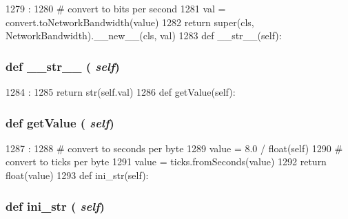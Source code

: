\begin{DoxyCode}
1279                            :
1280         # convert to bits per second
1281         val = convert.toNetworkBandwidth(value)
1282         return super(cls, NetworkBandwidth).__new__(cls, val)
1283 
    def __str__(self):
\end{DoxyCode}
\hypertarget{classm5_1_1params_1_1NetworkBandwidth_aa7a4b9bc0941308e362738503137460e}{
\subsubsection[{\_\-\_\-str\_\-\_\-}]{\setlength{\rightskip}{0pt plus 5cm}def \_\-\_\-str\_\-\_\- ( {\em self})}}
\label{classm5_1_1params_1_1NetworkBandwidth_aa7a4b9bc0941308e362738503137460e}



\begin{DoxyCode}
1284                      :
1285         return str(self.val)
1286 
    def getValue(self):
\end{DoxyCode}
\hypertarget{classm5_1_1params_1_1NetworkBandwidth_acc340fbd4335fa34f9d57fb454b28ed0}{
\subsubsection[{getValue}]{\setlength{\rightskip}{0pt plus 5cm}def getValue ( {\em self})}}
\label{classm5_1_1params_1_1NetworkBandwidth_acc340fbd4335fa34f9d57fb454b28ed0}



\begin{DoxyCode}
1287                       :
1288         # convert to seconds per byte
1289         value = 8.0 / float(self)
1290         # convert to ticks per byte
1291         value = ticks.fromSeconds(value)
1292         return float(value)
1293 
    def ini_str(self):
\end{DoxyCode}
\hypertarget{classm5_1_1params_1_1NetworkBandwidth_a33ebe6cd32bcbd15465fc28b9d94bf82}{
\subsubsection[{ini\_\-str}]{\setlength{\rightskip}{0pt plus 5cm}def ini\_\-str ( {\em self})}}
\label{classm5_1_1params_1_1NetworkBandwidth_a33ebe6cd32bcbd15465fc28b9d94bf82}


